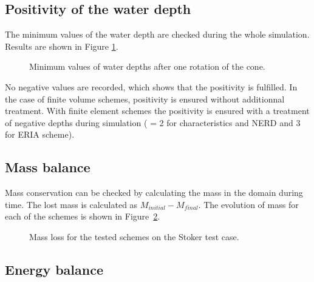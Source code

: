 \subsection{Positivity of the water depth}

The minimum values of the water depth are checked during the whole simulation.
Results are shown in Figure \ref{t2d:stoker:minmax}.

\begin{figure}[H]
\centering
{}
\caption{Minimum values of water depths after one rotation of the cone.}
\label{t2d:stoker:minmax}
\end{figure}

No negative values are recorded, which shows that the positivity is fulfilled.
In the case of finite volume schemes, positivity is ensured without additionnal
treatment.
With finite element schemes the positivity is ensured with a treatment of
negative depths during simulation ( = 2 for
characteristics and NERD and 3 for ERIA scheme).

\subsection{Mass balance}

Mass conservation can be checked by calculating the mass in the domain during time.
The lost mass is calculated as $M_{initial} - M_{final}$.
The evolution of mass for each of the schemes is shown in
Figure~\ref{fig:stoker:VoLTime}.

\begin{figure}[H]
\centering
  \caption{Mass loss for the tested schemes on the Stoker test case.}
\label{fig:stoker:VoLTime}
\end{figure}

\subsection{Energy balance}

